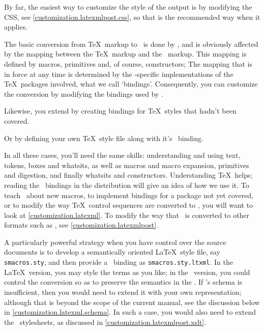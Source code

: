 \documentclass{book}
\begin{document}
By far, the easiest way to customize the style of the output is by modifying the CSS,
see \ref{customization.latexmlpost.css}, so that is the recommended way
when it applies.

The basic conversion from \TeX\ markup to \XML\ is done by
, and is obviously affected by the mapping between the \TeX\ markup
and the \XML\ markup.  This mapping is defined by macros, primitives and, of course,
constructors;  The mapping that is in force at any time is determined by the
\LaTeXML-specific implementations of the \TeX\ packages involved, what we call `bindings'.
Consequently, you can customize the conversion by modifying the
bindings used by .

Likewise, you extend  by creating bindings for
\TeX\ styles that hadn't been covered.

Or by defining your own \TeX\ style file along with it's \LaTeXML\ binding.

In all these cases, you'll need the same skills: understanding and using
text, tokens, boxes and whatsits, as well as macros and macro expansion,
primitives and digestion, and finally whatsits and constructors.
Understanding \TeX\ helps; reading the \LaTeXML\ bindings in the distribution
will give an idea of how we use it.
To teach \LaTeXML\ about new macros, to implement bindings for a
package not yet covered, or to modify the way \TeX\ control sequences
are converted to \XML, you will want to look at \ref{customization.latexml}.
To modify the way that \XML\ is converted to other formats such as \HTML,
see \ref{customization.latexmlpost}.

A particularly powerful strategy when you have control over the
source documents is to develop a semantically oriented \LaTeX\ style file,
say \texttt{smacros.sty}, and then provide a \LaTeXML\ binding
as \texttt{smacros.sty.ltxml}. In the \LaTeX\ version, you may style
the terms as you like; in the \LaTeXML\ version, you could control
the conversion so as to preserve the semantics in the \XML.
If \LaTeXML's schema is insufficient, then you would need to extend it
with your own representation; although that is beyond the scope of
the current manual, see the discussion below in \ref{customization.latexml.schema}.
In such a case, you would also need to extend the \XSLT\ stylesheets,
as discussed in \ref{customization.latexmlpost.xslt}.
\end{document}
